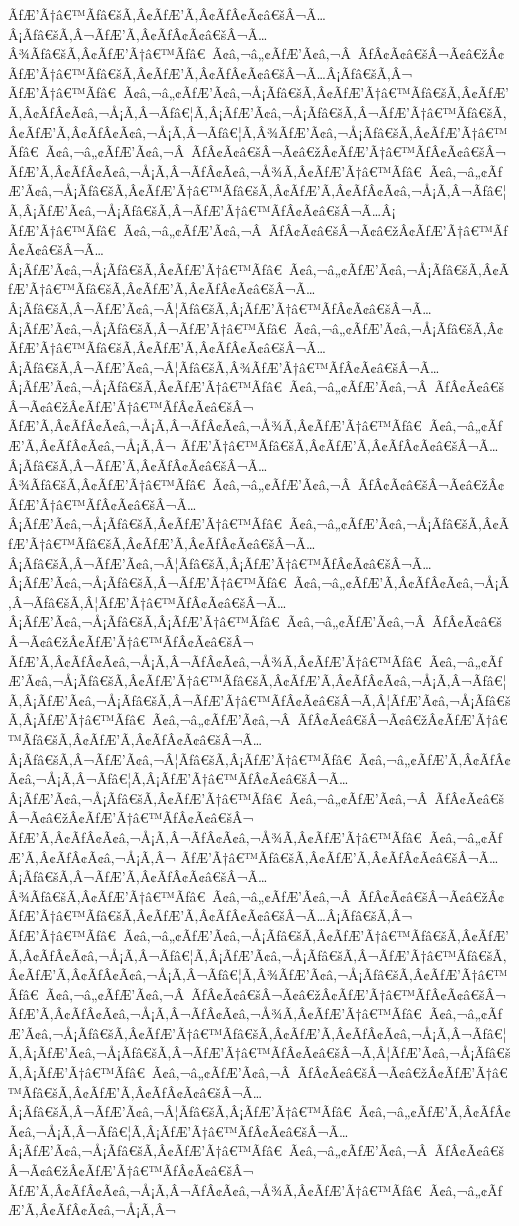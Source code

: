 \documentclass{gemoc} %
\begin{document}
ÃƒÆ’Ã†â€™Ãƒâ€šÃ‚Â¢ÃƒÆ’Ã‚Â¢ÃƒÂ¢Ã¢â€šÂ¬Ã…Â¡Ãƒâ€šÃ‚Â¬ÃƒÆ’Ã‚Â¢ÃƒÂ¢Ã¢â€šÂ¬Ã…Â¾Ãƒâ€šÃ‚Â¢ÃƒÆ’Ã†â€™Ãƒâ€ Ã¢â‚¬â„¢ÃƒÆ’Ã¢â‚¬Â ÃƒÂ¢Ã¢â€šÂ¬Ã¢â€žÂ¢ÃƒÆ’Ã†â€™Ãƒâ€šÃ‚Â¢ÃƒÆ’Ã‚Â¢ÃƒÂ¢Ã¢â€šÂ¬Ã…Â¡Ãƒâ€šÃ‚Â¬ ÃƒÆ’Ã†â€™Ãƒâ€ Ã¢â‚¬â„¢ÃƒÆ’Ã¢â‚¬Å¡Ãƒâ€šÃ‚Â¢ÃƒÆ’Ã†â€™Ãƒâ€šÃ‚Â¢ÃƒÆ’Ã‚Â¢ÃƒÂ¢Ã¢â‚¬Å¡Ã‚Â¬Ãƒâ€¦Ã‚Â¡ÃƒÆ’Ã¢â‚¬Å¡Ãƒâ€šÃ‚Â¬ÃƒÆ’Ã†â€™Ãƒâ€šÃ‚Â¢ÃƒÆ’Ã‚Â¢ÃƒÂ¢Ã¢â‚¬Å¡Ã‚Â¬Ãƒâ€¦Ã‚Â¾ÃƒÆ’Ã¢â‚¬Å¡Ãƒâ€šÃ‚Â¢ÃƒÆ’Ã†â€™Ãƒâ€ Ã¢â‚¬â„¢ÃƒÆ’Ã¢â‚¬Â ÃƒÂ¢Ã¢â€šÂ¬Ã¢â€žÂ¢ÃƒÆ’Ã†â€™ÃƒÂ¢Ã¢â€šÂ¬ ÃƒÆ’Ã‚Â¢ÃƒÂ¢Ã¢â‚¬Å¡Ã‚Â¬ÃƒÂ¢Ã¢â‚¬Å¾Ã‚Â¢ÃƒÆ’Ã†â€™Ãƒâ€ Ã¢â‚¬â„¢ÃƒÆ’Ã¢â‚¬Å¡Ãƒâ€šÃ‚Â¢ÃƒÆ’Ã†â€™Ãƒâ€šÃ‚Â¢ÃƒÆ’Ã‚Â¢ÃƒÂ¢Ã¢â‚¬Å¡Ã‚Â¬Ãƒâ€¦Ã‚Â¡ÃƒÆ’Ã¢â‚¬Å¡Ãƒâ€šÃ‚Â¬ÃƒÆ’Ã†â€™ÃƒÂ¢Ã¢â€šÂ¬Ã…Â¡ ÃƒÆ’Ã†â€™Ãƒâ€ Ã¢â‚¬â„¢ÃƒÆ’Ã¢â‚¬Â ÃƒÂ¢Ã¢â€šÂ¬Ã¢â€žÂ¢ÃƒÆ’Ã†â€™ÃƒÂ¢Ã¢â€šÂ¬Ã…Â¡ÃƒÆ’Ã¢â‚¬Å¡Ãƒâ€šÃ‚Â¢ÃƒÆ’Ã†â€™Ãƒâ€ Ã¢â‚¬â„¢ÃƒÆ’Ã¢â‚¬Å¡Ãƒâ€šÃ‚Â¢ÃƒÆ’Ã†â€™Ãƒâ€šÃ‚Â¢ÃƒÆ’Ã‚Â¢ÃƒÂ¢Ã¢â€šÂ¬Ã…Â¡Ãƒâ€šÃ‚Â¬ÃƒÆ’Ã¢â‚¬Â¦Ãƒâ€šÃ‚Â¡ÃƒÆ’Ã†â€™ÃƒÂ¢Ã¢â€šÂ¬Ã…Â¡ÃƒÆ’Ã¢â‚¬Å¡Ãƒâ€šÃ‚Â¬ÃƒÆ’Ã†â€™Ãƒâ€ Ã¢â‚¬â„¢ÃƒÆ’Ã¢â‚¬Å¡Ãƒâ€šÃ‚Â¢ÃƒÆ’Ã†â€™Ãƒâ€šÃ‚Â¢ÃƒÆ’Ã‚Â¢ÃƒÂ¢Ã¢â€šÂ¬Ã…Â¡Ãƒâ€šÃ‚Â¬ÃƒÆ’Ã¢â‚¬Â¦Ãƒâ€šÃ‚Â¾ÃƒÆ’Ã†â€™ÃƒÂ¢Ã¢â€šÂ¬Ã…Â¡ÃƒÆ’Ã¢â‚¬Å¡Ãƒâ€šÃ‚Â¢ÃƒÆ’Ã†â€™Ãƒâ€ Ã¢â‚¬â„¢ÃƒÆ’Ã¢â‚¬Â ÃƒÂ¢Ã¢â€šÂ¬Ã¢â€žÂ¢ÃƒÆ’Ã†â€™ÃƒÂ¢Ã¢â€šÂ¬ ÃƒÆ’Ã‚Â¢ÃƒÂ¢Ã¢â‚¬Å¡Ã‚Â¬ÃƒÂ¢Ã¢â‚¬Å¾Ã‚Â¢ÃƒÆ’Ã†â€™Ãƒâ€ Ã¢â‚¬â„¢ÃƒÆ’Ã‚Â¢ÃƒÂ¢Ã¢â‚¬Å¡Ã‚Â¬ ÃƒÆ’Ã†â€™Ãƒâ€šÃ‚Â¢ÃƒÆ’Ã‚Â¢ÃƒÂ¢Ã¢â€šÂ¬Ã…Â¡Ãƒâ€šÃ‚Â¬ÃƒÆ’Ã‚Â¢ÃƒÂ¢Ã¢â€šÂ¬Ã…Â¾Ãƒâ€šÃ‚Â¢ÃƒÆ’Ã†â€™Ãƒâ€ Ã¢â‚¬â„¢ÃƒÆ’Ã¢â‚¬Â ÃƒÂ¢Ã¢â€šÂ¬Ã¢â€žÂ¢ÃƒÆ’Ã†â€™ÃƒÂ¢Ã¢â€šÂ¬Ã…Â¡ÃƒÆ’Ã¢â‚¬Å¡Ãƒâ€šÃ‚Â¢ÃƒÆ’Ã†â€™Ãƒâ€ Ã¢â‚¬â„¢ÃƒÆ’Ã¢â‚¬Å¡Ãƒâ€šÃ‚Â¢ÃƒÆ’Ã†â€™Ãƒâ€šÃ‚Â¢ÃƒÆ’Ã‚Â¢ÃƒÂ¢Ã¢â€šÂ¬Ã…Â¡Ãƒâ€šÃ‚Â¬ÃƒÆ’Ã¢â‚¬Â¦Ãƒâ€šÃ‚Â¡ÃƒÆ’Ã†â€™ÃƒÂ¢Ã¢â€šÂ¬Ã…Â¡ÃƒÆ’Ã¢â‚¬Å¡Ãƒâ€šÃ‚Â¬ÃƒÆ’Ã†â€™Ãƒâ€ Ã¢â‚¬â„¢ÃƒÆ’Ã‚Â¢ÃƒÂ¢Ã¢â‚¬Å¡Ã‚Â¬Ãƒâ€šÃ‚Â¦ÃƒÆ’Ã†â€™ÃƒÂ¢Ã¢â€šÂ¬Ã…Â¡ÃƒÆ’Ã¢â‚¬Å¡Ãƒâ€šÃ‚Â¡ÃƒÆ’Ã†â€™Ãƒâ€ Ã¢â‚¬â„¢ÃƒÆ’Ã¢â‚¬Â ÃƒÂ¢Ã¢â€šÂ¬Ã¢â€žÂ¢ÃƒÆ’Ã†â€™ÃƒÂ¢Ã¢â€šÂ¬ ÃƒÆ’Ã‚Â¢ÃƒÂ¢Ã¢â‚¬Å¡Ã‚Â¬ÃƒÂ¢Ã¢â‚¬Å¾Ã‚Â¢ÃƒÆ’Ã†â€™Ãƒâ€ Ã¢â‚¬â„¢ÃƒÆ’Ã¢â‚¬Å¡Ãƒâ€šÃ‚Â¢ÃƒÆ’Ã†â€™Ãƒâ€šÃ‚Â¢ÃƒÆ’Ã‚Â¢ÃƒÂ¢Ã¢â‚¬Å¡Ã‚Â¬Ãƒâ€¦Ã‚Â¡ÃƒÆ’Ã¢â‚¬Å¡Ãƒâ€šÃ‚Â¬ÃƒÆ’Ã†â€™ÃƒÂ¢Ã¢â€šÂ¬Ã‚Â¦ÃƒÆ’Ã¢â‚¬Å¡Ãƒâ€šÃ‚Â¡ÃƒÆ’Ã†â€™Ãƒâ€ Ã¢â‚¬â„¢ÃƒÆ’Ã¢â‚¬Â ÃƒÂ¢Ã¢â€šÂ¬Ã¢â€žÂ¢ÃƒÆ’Ã†â€™Ãƒâ€šÃ‚Â¢ÃƒÆ’Ã‚Â¢ÃƒÂ¢Ã¢â€šÂ¬Ã…Â¡Ãƒâ€šÃ‚Â¬ÃƒÆ’Ã¢â‚¬Â¦Ãƒâ€šÃ‚Â¡ÃƒÆ’Ã†â€™Ãƒâ€ Ã¢â‚¬â„¢ÃƒÆ’Ã‚Â¢ÃƒÂ¢Ã¢â‚¬Å¡Ã‚Â¬Ãƒâ€¦Ã‚Â¡ÃƒÆ’Ã†â€™ÃƒÂ¢Ã¢â€šÂ¬Ã…Â¡ÃƒÆ’Ã¢â‚¬Å¡Ãƒâ€šÃ‚Â¢ÃƒÆ’Ã†â€™Ãƒâ€ Ã¢â‚¬â„¢ÃƒÆ’Ã¢â‚¬Â ÃƒÂ¢Ã¢â€šÂ¬Ã¢â€žÂ¢ÃƒÆ’Ã†â€™ÃƒÂ¢Ã¢â€šÂ¬ ÃƒÆ’Ã‚Â¢ÃƒÂ¢Ã¢â‚¬Å¡Ã‚Â¬ÃƒÂ¢Ã¢â‚¬Å¾Ã‚Â¢ÃƒÆ’Ã†â€™Ãƒâ€ Ã¢â‚¬â„¢ÃƒÆ’Ã‚Â¢ÃƒÂ¢Ã¢â‚¬Å¡Ã‚Â¬ ÃƒÆ’Ã†â€™Ãƒâ€šÃ‚Â¢ÃƒÆ’Ã‚Â¢ÃƒÂ¢Ã¢â€šÂ¬Ã…Â¡Ãƒâ€šÃ‚Â¬ÃƒÆ’Ã‚Â¢ÃƒÂ¢Ã¢â€šÂ¬Ã…Â¾Ãƒâ€šÃ‚Â¢ÃƒÆ’Ã†â€™Ãƒâ€ Ã¢â‚¬â„¢ÃƒÆ’Ã¢â‚¬Â ÃƒÂ¢Ã¢â€šÂ¬Ã¢â€žÂ¢ÃƒÆ’Ã†â€™Ãƒâ€šÃ‚Â¢ÃƒÆ’Ã‚Â¢ÃƒÂ¢Ã¢â€šÂ¬Ã…Â¡Ãƒâ€šÃ‚Â¬ ÃƒÆ’Ã†â€™Ãƒâ€ Ã¢â‚¬â„¢ÃƒÆ’Ã¢â‚¬Å¡Ãƒâ€šÃ‚Â¢ÃƒÆ’Ã†â€™Ãƒâ€šÃ‚Â¢ÃƒÆ’Ã‚Â¢ÃƒÂ¢Ã¢â‚¬Å¡Ã‚Â¬Ãƒâ€¦Ã‚Â¡ÃƒÆ’Ã¢â‚¬Å¡Ãƒâ€šÃ‚Â¬ÃƒÆ’Ã†â€™Ãƒâ€šÃ‚Â¢ÃƒÆ’Ã‚Â¢ÃƒÂ¢Ã¢â‚¬Å¡Ã‚Â¬Ãƒâ€¦Ã‚Â¾ÃƒÆ’Ã¢â‚¬Å¡Ãƒâ€šÃ‚Â¢ÃƒÆ’Ã†â€™Ãƒâ€ Ã¢â‚¬â„¢ÃƒÆ’Ã¢â‚¬Â ÃƒÂ¢Ã¢â€šÂ¬Ã¢â€žÂ¢ÃƒÆ’Ã†â€™ÃƒÂ¢Ã¢â€šÂ¬ ÃƒÆ’Ã‚Â¢ÃƒÂ¢Ã¢â‚¬Å¡Ã‚Â¬ÃƒÂ¢Ã¢â‚¬Å¾Ã‚Â¢ÃƒÆ’Ã†â€™Ãƒâ€ Ã¢â‚¬â„¢ÃƒÆ’Ã¢â‚¬Å¡Ãƒâ€šÃ‚Â¢ÃƒÆ’Ã†â€™Ãƒâ€šÃ‚Â¢ÃƒÆ’Ã‚Â¢ÃƒÂ¢Ã¢â‚¬Å¡Ã‚Â¬Ãƒâ€¦Ã‚Â¡ÃƒÆ’Ã¢â‚¬Å¡Ãƒâ€šÃ‚Â¬ÃƒÆ’Ã†â€™ÃƒÂ¢Ã¢â€šÂ¬Ã‚Â¦ÃƒÆ’Ã¢â‚¬Å¡Ãƒâ€šÃ‚Â¡ÃƒÆ’Ã†â€™Ãƒâ€ Ã¢â‚¬â„¢ÃƒÆ’Ã¢â‚¬Â ÃƒÂ¢Ã¢â€šÂ¬Ã¢â€žÂ¢ÃƒÆ’Ã†â€™Ãƒâ€šÃ‚Â¢ÃƒÆ’Ã‚Â¢ÃƒÂ¢Ã¢â€šÂ¬Ã…Â¡Ãƒâ€šÃ‚Â¬ÃƒÆ’Ã¢â‚¬Â¦Ãƒâ€šÃ‚Â¡ÃƒÆ’Ã†â€™Ãƒâ€ Ã¢â‚¬â„¢ÃƒÆ’Ã‚Â¢ÃƒÂ¢Ã¢â‚¬Å¡Ã‚Â¬Ãƒâ€¦Ã‚Â¡ÃƒÆ’Ã†â€™ÃƒÂ¢Ã¢â€šÂ¬Ã…Â¡ÃƒÆ’Ã¢â‚¬Å¡Ãƒâ€šÃ‚Â¢ÃƒÆ’Ã†â€™Ãƒâ€ Ã¢â‚¬â„¢ÃƒÆ’Ã¢â‚¬Â ÃƒÂ¢Ã¢â€šÂ¬Ã¢â€žÂ¢ÃƒÆ’Ã†â€™ÃƒÂ¢Ã¢â€šÂ¬ ÃƒÆ’Ã‚Â¢ÃƒÂ¢Ã¢â‚¬Å¡Ã‚Â¬ÃƒÂ¢Ã¢â‚¬Å¾Ã‚Â¢ÃƒÆ’Ã†â€™Ãƒâ€ Ã¢â‚¬â„¢ÃƒÆ’Ã‚Â¢ÃƒÂ¢Ã¢â‚¬Å¡Ã‚Â¬ 
\end{document}
